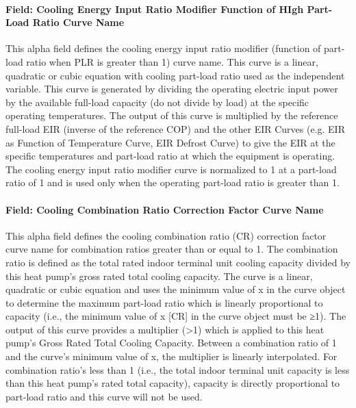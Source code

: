 \paragraph{Field: Cooling Energy Input Ratio Modifier Function of HIgh Part-Load Ratio Curve Name}\label{field-cooling-energy-input-ratio-modifier-function-of-high-part-load-ratio-curve-name}

This alpha field defines the cooling energy input ratio modifier (function of part-load ratio when PLR is greater than 1) curve name. This curve is a linear, quadratic or cubic equation with cooling part-load ratio used as the independent variable. This curve is generated by dividing the operating electric input power by the available full-load capacity (do not divide by load) at the specific operating temperatures. The output of this curve is multiplied by the reference full-load EIR (inverse of the reference COP) and the other EIR Curves (e.g. EIR as Function of Temperature Curve, EIR Defrost Curve) to give the EIR at the specific temperatures and part-load ratio at which the equipment is operating. The cooling energy input ratio modifier curve is normalized to 1 at a part-load ratio of 1 and is used only when the operating part-load ratio is greater than 1.

\paragraph{Field: Cooling Combination Ratio Correction Factor Curve Name}\label{field-cooling-combination-ratio-correction-factor-curve-name}

This alpha field defines the cooling combination ratio (CR) correction factor curve name for combination ratios greater than or equal to 1. The combination ratio is defined as the total rated indoor terminal unit cooling capacity divided by this heat pump's gross rated total cooling capacity. The curve is a linear, quadratic or cubic equation and uses the minimum value of x in the curve object to determine the maximum part-load ratio which is linearly proportional to capacity (i.e., the minimum value of x {[}CR{]} in the curve object must be ≥1). The output of this curve provides a multiplier (\textgreater{}1) which is applied to this heat pump's Gross Rated Total Cooling Capacity. Between a combination ratio of 1 and the curve's minimum value of x, the multiplier is linearly interpolated. For combination ratio's less than 1 (i.e., the total indoor terminal unit capacity is less than this heat pump's rated total capacity), capacity is directly proportional to part-load ratio and this curve will not be used.

